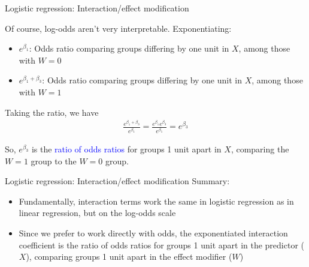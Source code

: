 \documentclass[10pt,t]{beamer}
\begin{document}
\begin{frame}{Logistic regression: Interaction/effect modification}
	
	Of course, log-odds aren't very interpretable. Exponentiating:
	
	\medskip
	
	\begin{itemize}
		\item $e^{\beta_1}$: Odds ratio comparing groups differing by one unit in $X$, among those with $W = 0$ 
		
		\medskip
		
		\item $e^{\beta_1 + \beta_3}$: Odds ratio comparing groups differing by one unit in $X$, among those with $W = 1$ 
	\end{itemize}

\bigskip

	Taking the ratio, we have
	\begin{align*}
	\frac{e^{\beta_1 + \beta_3}}{e^{\beta_1}} = \frac{e^{\beta_1}e^{\beta_3}}{e^{\beta_1}} = e^{\beta_3}
	\end{align*} 
	
	\medskip
	
	So, $e^{\beta_3}$ is the \textcolor{blue}{ratio of odds ratios} for groups 1 unit apart in $X$, comparing the $W = 1$ group to the $W = 0$ group. 
\end{frame}

\begin{frame}{Logistic regression: Interaction/effect modification}
	Summary: 
	
	\bigskip
	
	\begin{itemize}
		\item Fundamentally, interaction terms work the same in logistic regression as in linear regression, but on the log-odds scale
		
		\medskip
		
		\item Since we prefer to work directly with odds, the exponentiated interaction coefficient is the ratio of odds ratios for groups 1 unit apart in the predictor ($X$), comparing groups 1 unit apart in the effect modifier ($W$)
	\end{itemize}
\end{frame}
\end{document}
